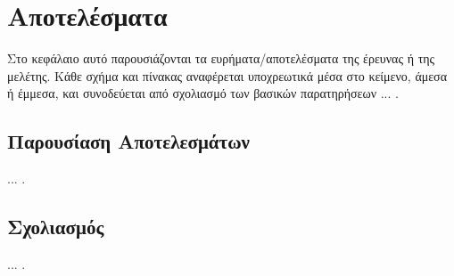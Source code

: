 \section{Αποτελέσματα}

Στο κεφάλαιο αυτό παρουσιάζονται τα ευρήματα/αποτελέσματα της έρευνας ή
της μελέτης. Κάθε σχήμα και πίνακας αναφέρεται υποχρεωτικά μέσα στο κείμενο,
άμεσα ή έμμεσα, και συνοδεύεται από σχολιασμό των βασικών παρατηρήσεων ... .

\subsection{Παρουσίαση Αποτελεσμάτων}

... .

\subsection{Σχολιασμός}

... .
